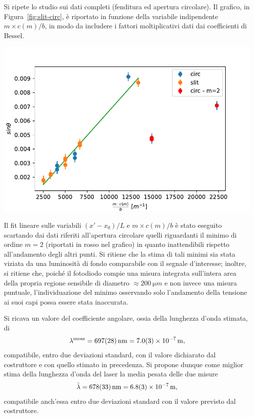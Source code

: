 \documentclass[10pt,oneside,a4paper]{article}
\newenvironment{Figure}
  {\par\medskip\noindent\minipage{\linewidth}}
  {\endminipage\par\medskip}
\begin{document}
\begin{multicols}{2}
Si ripete lo studio sui dati completi (fenditura ed apertura circolare). Il grafico, in Figura~\ref{fig:slit-circ}, è riportato in funzione della variabile indipendente $m\times c(m)/b$, in modo da includere i fattori moltiplicativi dati dai coefficienti di Bessel. 
\begin{Figure}
	\begin{center}
	\includegraphics[width=1.1\linewidth]{slit-circ}
	\label{fig:slit-circ}
	\end{center}
\end{Figure}
Il fit lineare sulle variabili $(x'-x_0)/L$ e $m \times c(m)/b$ è stato eseguito scartando dai dati riferiti all'apertura circolare quelli riguardanti il minimo di ordine $m=2$ (riportati in rosso nel grafico) in quanto inattendibili rispetto all'andamento degli altri punti. Si ritiene che la stima di tali minimi sia stata viziata da una luminosità di fondo comparabile con il segnale d'interesse; inoltre, si ritiene che, poiché il fotodiodo compie una misura integrata sull'intera area della propria regione sensibile di diametro $\approx \SI{200}{\micro m}$ e non invece una misura puntuale, l'individuazione del minimo osservando solo l'andamento della tensione ai suoi capi possa essere stata inaccurata. 

Si ricava un valore del coefficiente angolare, ossia della lunghezza d'onda stimata, di
\[
\lambda^{\text{meas}} = \SI{697 \pm 28}{nm} = \SI{7.0 \pm 0.3 e-7}{m},
\]
compatibile, entro due deviazioni standard, con il valore dichiarato dal costruttore e con quello stimato in precedenza. Si propone dunque come miglior stima della lunghezza d'onda del laser la media pesata delle due misure
\[
\bar \lambda = \SI{678 \pm 33}{nm} = \SI{6.8 \pm 0.3 e-7}{m},
\]
compatibile anch'essa entro due deviazioni standard con il valore previsto dal costruttore.


\end{multicols}
\end{document}
